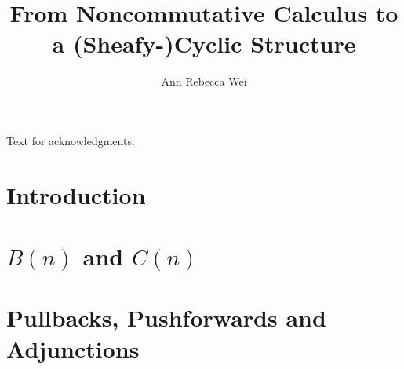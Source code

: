 \documentclass[12pt]{nuthesis} %
\author{Ann Rebecca Wei}
\title{From Noncommutative Calculus to a (Sheafy-)Cyclic Structure}
\theoremstyle{definition}
\theoremstyle{remark}
\theoremstyle{example}
\begin{document}

\frontmatter		%
\maketitle		%

\abstract		%


\acknowledgements	%
Text for acknowledgments.




\nomenclature %


%
%
\clearpage{} %
\tableofcontents	%

\clearpage{} %
\listoftables		%

\clearpage{} %
\listoffigures		%



\mainmatter             %

\chapter{Introduction}
	

\chapter{$B(n)$ and $C(n)$}
	
	
	
%
\chapter{Pullbacks, Pushforwards and Adjunctions}
	
	
	
	
	
	
%
\end{document}

